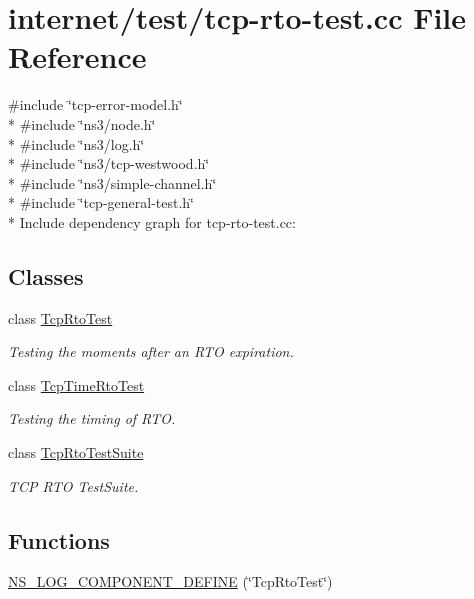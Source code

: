 \hypertarget{tcp-rto-test_8cc}{}\section{internet/test/tcp-\/rto-\/test.cc File Reference}
\label{tcp-rto-test_8cc}
{\ttfamily \#include \char`\"{}tcp-\/error-\/model.\+h\char`\"{}}\\*
{\ttfamily \#include \char`\"{}ns3/node.\+h\char`\"{}}\\*
{\ttfamily \#include \char`\"{}ns3/log.\+h\char`\"{}}\\*
{\ttfamily \#include \char`\"{}ns3/tcp-\/westwood.\+h\char`\"{}}\\*
{\ttfamily \#include \char`\"{}ns3/simple-\/channel.\+h\char`\"{}}\\*
{\ttfamily \#include \char`\"{}tcp-\/general-\/test.\+h\char`\"{}}\\*
Include dependency graph for tcp-\/rto-\/test.cc\+:
\subsection*{Classes}
\begin{DoxyCompactItemize}
\item 
class \hyperlink{classTcpRtoTest}{Tcp\+Rto\+Test}
\begin{DoxyCompactList}\small\item\em Testing the moments after an R\+TO expiration. \end{DoxyCompactList}\item 
class \hyperlink{classTcpTimeRtoTest}{Tcp\+Time\+Rto\+Test}
\begin{DoxyCompactList}\small\item\em Testing the timing of R\+TO. \end{DoxyCompactList}\item 
class \hyperlink{classTcpRtoTestSuite}{Tcp\+Rto\+Test\+Suite}
\begin{DoxyCompactList}\small\item\em T\+CP R\+TO Test\+Suite. \end{DoxyCompactList}\end{DoxyCompactItemize}
\subsection*{Functions}
\begin{DoxyCompactItemize}
\item 
\hyperlink{tcp-rto-test_8cc_a213022fc87c469de4bfead8b0598255d}{N\+S\+\_\+\+L\+O\+G\+\_\+\+C\+O\+M\+P\+O\+N\+E\+N\+T\+\_\+\+D\+E\+F\+I\+NE} (\char`\"{}Tcp\+Rto\+Test\char`\"{})
\end{DoxyCompactItemize}
